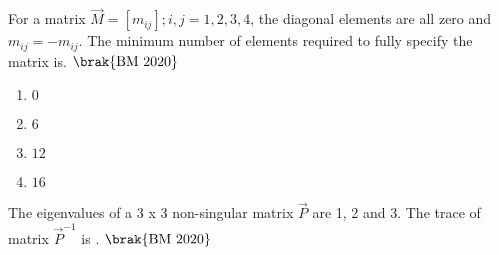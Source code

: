 \item  For a matrix $\vec{M}={[m_{ij}]};i,j=1,2,3,4$, the diagonal elements are all zero and ${m_{ij}}=-$${m_{ij}}$. The minimum number of elements required to fully specify the matrix is\underline{\hspace{2cm}}.
\hfill $\brak{\text{BM 2020}}$
	\begin{multicols}{4}
\begin{enumerate}
\item $0$
\item $6$
\item $12$
\item $16$\\
\end{enumerate}
\end{multicols}
\item The eigenvalues of a 3 x 3 non-singular matrix $\vec{P}$ are 1, 2 and 3. The trace of matrix \( \vec{P}^{-1} \)  is \underline{\hspace{2cm}}.
 \hfill $\brak{\text{BM 2020}}$
